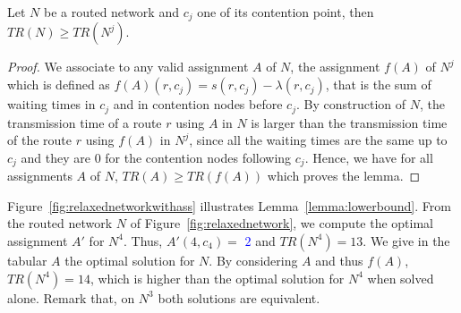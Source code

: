\begin{lemma}\label{lemma:lowerbound}
Let $N$ be a routed network and $c_j$ one of its contention point, then $TR(N) \geq TR(N^j)$.
\end{lemma}
\begin{proof}
We associate to any valid assignment $A$ of $N$, the assignment $f(A)$ of $N^j$
which is defined as $f(A)(r,c_j) = s(r,c_j) - \lambda(r,c_j)$, that is the sum of waiting times in $c_j$ and in contention nodes before $c_j$. By construction of $N$, the transmission time of a route $r$ using $A$ in $N$ is larger than 
the transmission time of the route $r$ using $f(A)$ in $N^j$, since all the waiting times are the same up to 
$c_j$ and they are $0$ for the contention nodes following $c_j$. Hence, we have for all assignments $A$ of $N$,
$TR(A) \geq TR(f(A))$ which proves the lemma. 
\end{proof}


Figure~\ref{fig:relaxednetworkwithass} illustrates Lemma~\ref{lemma:lowerbound}. From the routed network $N$ of Figure~\ref{fig:relaxednetwork}, we compute the optimal assignment $A'$ for $N^4$. Thus, $A'(4,c_4) =$ \textcolor{blue}{$2$} and $TR(N^4) = 13$.
We give in the tabular $A$ the optimal solution for $N$. By considering $A$ and thus $f(A)$, $TR(N^4) = 14$, which is higher than the optimal solution for $N^4$ when solved alone. Remark that, on $N^3$ both solutions are equivalent.




